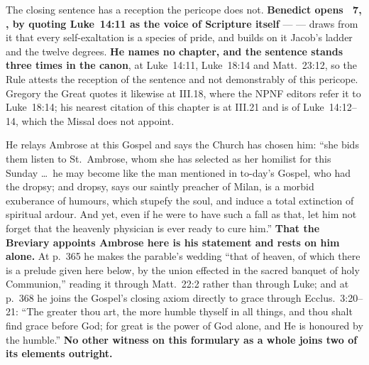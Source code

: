 The closing sentence has a reception the pericope does not. \textbf{Benedict
opens ~7, , by quoting Luke~14:11 as the voice
of Scripture itself} ---  --- draws from
it that every self-exaltation is a species of pride, and builds on it Jacob's
ladder and the twelve degrees. \textbf{He names no chapter, and the sentence
stands three times in the canon}, at Luke~14:11, Luke~18:14 and Matt.~23:12, so
the Rule attests the reception of the sentence and not demonstrably of this
pericope. Gregory the Great quotes it likewise at 
III.18, where the NPNF editors refer it to Luke~18:14; his nearest citation of
this chapter is at III.21 and is of Luke~14:12--14, which the Missal does not
appoint.

\begin{witnessnote}
He relays Ambrose at this Gospel and says the Church has chosen him: ``she bids
them listen to St.~Ambrose, whom she has selected as her homilist for this Sunday
\dots\ he may become like the man mentioned in to-day's Gospel, who had the
dropsy; and dropsy, says our saintly preacher of Milan, is a morbid exuberance of
humours, which stupefy the soul, and induce a total extinction of spiritual
ardour. And yet, even if he were to have such a fall as that, let him not forget
that the heavenly physician is ever ready to cure him.'' \textbf{That the Breviary
appoints Ambrose here is his statement and rests on him alone.} At p.~365 he
makes the parable's wedding ``that of heaven, of which there is a prelude given
here below, by the union effected in the sacred banquet of holy Communion,''
reading it through Matt.~22:2 rather than through Luke; and at p.~368 he joins
the Gospel's closing axiom directly to grace through Ecclus.~3:20--21: ``The
greater thou art, the more humble thyself in all things, and thou shalt find
grace before God; for great is the power of God alone, and He is honoured by the
humble.'' \textbf{No other witness on this formulary as a whole
joins two of its elements outright.}
\end{witnessnote}

